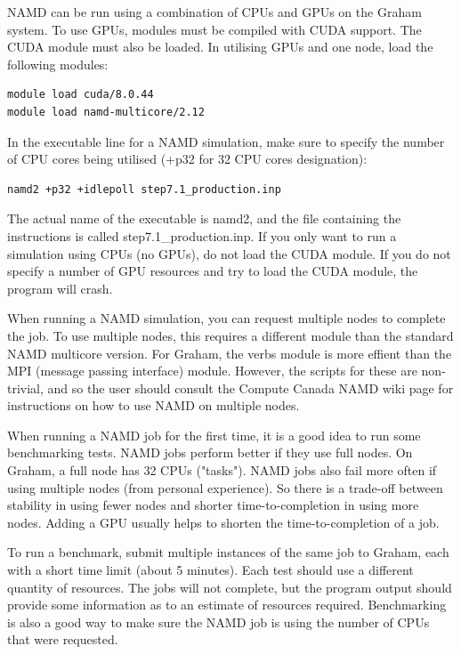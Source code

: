 \documentclass[12pt]{article}
\begin{document}
\quad NAMD can be run using a combination of CPUs and GPUs on the Graham system. To use GPUs, modules must be compiled with CUDA support. The CUDA module must also be loaded. In utilising GPUs and one node, load the following modules:

\begin{lstlisting}[numbers=none]
module load cuda/8.0.44
module load namd-multicore/2.12
\end{lstlisting}

\quad In the executable line for a NAMD simulation, make sure to specify the number of CPU cores being utilised (+p32 for 32 CPU cores designation):

\begin{lstlisting}[numbers=none]
namd2 +p32 +idlepoll step7.1_production.inp
\end{lstlisting}

\quad The actual name of the executable is namd2, and the file containing the instructions is called step7.1\_production.inp. If you only want to run a simulation using CPUs (no GPUs), do not load the CUDA module. If you do not specify a number of GPU resources and try to load the CUDA module, the program will crash. 

\quad When running a NAMD simulation, you can request multiple nodes to complete the job. To use multiple nodes, this requires a different module than the standard NAMD multicore version. For Graham, the verbs module is more effient than the MPI (message passing interface) module. However, the scripts for these are non-trivial, and so the user should consult the Compute Canada NAMD wiki page for instructions on how to use NAMD on multiple nodes.

\quad When running a NAMD job for the first time, it is a good idea to run some benchmarking tests. NAMD jobs perform better if they use full nodes. On Graham, a full node has 32 CPUs ("tasks"). NAMD jobs also fail more often if using multiple nodes (from personal experience). So there is a trade-off between stability in using fewer nodes and shorter time-to-completion in using more nodes. Adding a GPU usually helps to shorten the time-to-completion of a job.

\quad To run a benchmark, submit multiple instances of the same job to Graham, each with a short time limit (about 5 minutes). Each test should use a different quantity of resources. The jobs will not complete,  but the program output should provide some information as to an estimate of resources required. Benchmarking is also a good way to make sure the NAMD job is using the number of CPUs that were requested.
\end{document}

